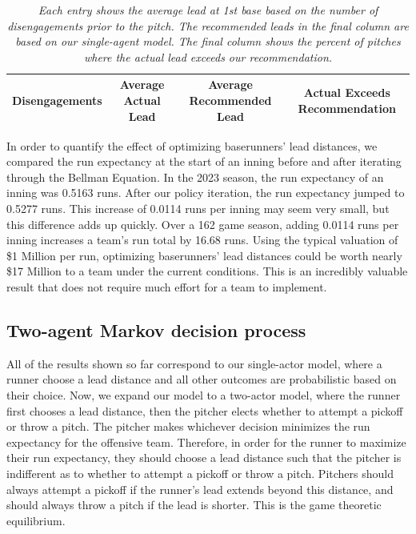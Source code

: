 \documentclass{article}
\begin{document}
      \begin{table}
        \centering
        \begin{tabular}{c|ccc}
          Disengagements & Average Actual Lead & Average Recommended Lead & Actual Exceeds Recommendation\\
          \hline
          
        \end{tabular}
        \caption{
          \it Each entry shows the average lead at 1st base based on the number of disengagements prior to the pitch. The recommended leads in the final column are based on our single-agent model. The final column shows the percent of pitches where the actual lead exceeds our recommendation.
        }
        \label{tab:actual-vs-rec}
      \end{table}

      In order to quantify the effect of optimizing baserunners' lead distances, we compared the run expectancy at the start of an inning before and after iterating through the Bellman Equation. In the 2023 season, the run expectancy of an inning was 0.5163 runs. After our policy iteration, the run expectancy jumped to 0.5277 runs. This increase of 0.0114 runs per inning may seem very small, but this difference adds up quickly. Over a 162 game season, adding 0.0114 runs per inning increases a team's run total by 16.68 runs. Using the typical valuation of \$1 Million per run, optimizing baserunners' lead distances could be worth nearly \$17 Million to a team under the current conditions. This is an incredibly valuable result that does not require much effort for a team to implement.

    \subsection{Two-agent Markov decision process}

      All of the results shown so far correspond to our single-actor model, where a runner choose a lead distance and all other outcomes are probabilistic based on their choice. Now, we expand our model to a two-actor model, where the runner first chooses a lead distance, then the pitcher elects whether to attempt a pickoff or throw a pitch. The pitcher makes whichever decision minimizes the run expectancy for the offensive team. Therefore, in order for the runner to maximize their run expectancy, they should choose a lead distance such that the pitcher is indifferent as to whether to attempt a pickoff or throw a pitch. Pitchers should always attempt a pickoff if the runner's lead extends beyond this distance, and should always throw a pitch if the lead is shorter. This is the game theoretic equilibrium.
\end{document}
